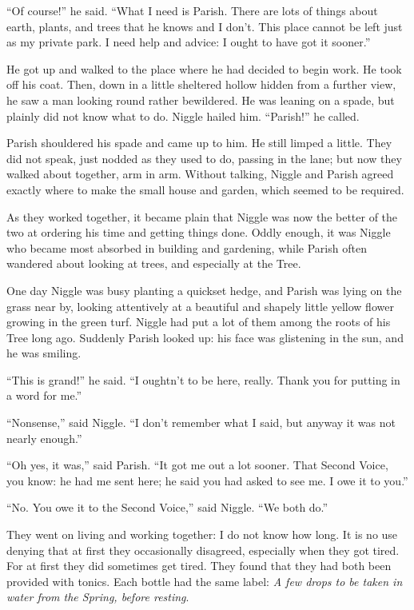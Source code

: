 \documentclass[english]{scrartcl}
\begin{document}
“Of course!” he said. “What I need is Parish. There are lots of things about earth, plants, and trees that he knows and I don’t. This place cannot be left just as my private park. I need help and advice: I ought to have got it sooner.”

He got up and walked to the place where he had decided to begin work. He took off his coat. Then, down in a little sheltered hollow hidden from a further view, he saw a man looking round rather bewildered. He was leaning on a spade, but plainly did not know what to do. Niggle hailed him. “Parish!” he called.

Parish shouldered his spade and came up to him. He still limped a little. They did not speak, just nodded as they used to do, passing in the lane; but now they walked about together, arm in arm. Without talking, Niggle and Parish agreed exactly where to make the small house and garden, which seemed to be required.

As they worked together, it became plain that Niggle was now the better of the two at ordering his time and getting things done. Oddly enough, it was Niggle who became most absorbed in building and gardening, while Parish often wandered about looking at trees, and especially at the Tree.

One day Niggle was busy planting a quickset hedge, and Parish was lying on the grass near by, looking attentively at a beautiful and shapely little yellow flower growing in the green turf. Niggle had put a lot of them among the roots of his Tree long ago. Suddenly Parish looked up: his face was glistening in the sun, and he was smiling.

“This is grand!” he said. “I oughtn’t to be here, really. Thank you for putting in a word for me.”

“Nonsense,” said Niggle. “I don’t remember what I said, but anyway it was not nearly enough.”

“Oh yes, it was,” said Parish. “It got me out a lot sooner. That Second Voice, you know: he had me sent here; he said you had asked to see me. I owe it to you.”

“No. You owe it to the Second Voice,” said Niggle. “We both do.”

They went on living and working together: I do not know how long. It is no use denying that at first they occasionally disagreed, especially when they got tired. For at first they did sometimes get tired. They found that they had both been provided with tonics. Each bottle had the same label: \emph{A few drops to be taken in water from the Spring, before resting}.
\end{document}
